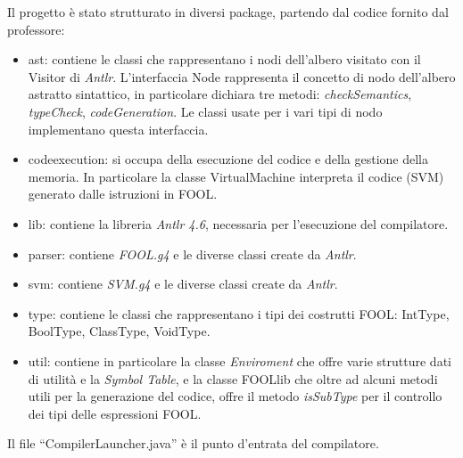 \documentclass{scrreprt}
\begin{document}
Il progetto è stato strutturato in diversi package, partendo dal codice fornito dal professore:
\begin{itemize}
    \item ast: contiene le classi che rappresentano i nodi dell'albero visitato con il Visitor di \textit{Antlr}. 
            L'interfaccia Node rappresenta il concetto di nodo dell'albero astratto sintattico, in particolare dichiara tre metodi:
            \textit{checkSemantics}, \textit{typeCheck}, \textit{codeGeneration}. Le classi usate per i vari tipi di nodo implementano questa interfaccia.
    \item codeexecution: si occupa della esecuzione del codice e della gestione della memoria. In particolare la classe VirtualMachine interpreta il codice (SVM) generato dalle istruzioni in FOOL.
    \item lib: contiene la libreria \textit{Antlr 4.6}, necessaria per l'esecuzione del compilatore.
    \item parser: contiene \textit{FOOL.g4} e le diverse classi create da \textit{Antlr}.
    \item svm:  contiene \textit{SVM.g4} e le diverse classi create da \textit{Antlr}.
    \item type: contiene le classi che rappresentano i tipi dei costrutti FOOL: IntType, BoolType, ClassType, VoidType.
    \item util: contiene in particolare la classe \textit{Enviroment} che offre varie strutture dati di utilità e la \textit{Symbol Table}, e la classe FOOLlib che oltre ad alcuni metodi utili
            per la generazione del codice, offre il metodo \textit{isSubType} per il controllo dei tipi delle espressioni FOOL.
\end{itemize}

Il file ``CompilerLauncher.java'' è il punto d'entrata del compilatore.
\end{document}
